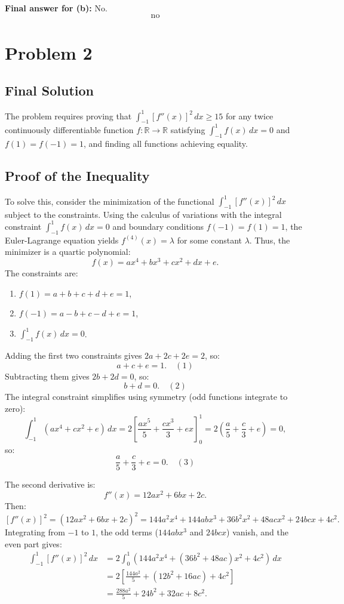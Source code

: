 \documentclass[12pt,a4paper]{article}
\theoremstyle{definition}
\begin{document}
    \textbf{Final answer for (b):} No.
    \[
        \boxed{\text{no}}
    \]

\section{Problem 2}
    \subsection{Final Solution}
    The problem requires proving that $\int_{-1}^{1} [f''(x)]^2 \, dx \geq 15$ for any twice continuously differentiable function $f: \mathbb{R} \to \mathbb{R}$ satisfying $\int_{-1}^{1} f(x) \, dx = 0$ and $f(1) = f(-1) = 1$, and finding all functions achieving equality.

    \subsection*{Proof of the Inequality}
    To solve this, consider the minimization of the functional $\int_{-1}^{1} [f''(x)]^2 \, dx$ subject to the constraints. Using the calculus of variations with the integral constraint $\int_{-1}^{1} f(x) \, dx = 0$ and boundary conditions $f(-1) = f(1) = 1$, the Euler-Lagrange equation yields $f^{(4)}(x) = \lambda$ for some constant $\lambda$. Thus, the minimizer is a quartic polynomial:
    \[
        f(x) = a x^4 + b x^3 + c x^2 + d x + e.
    \]
    The constraints are:
    \begin{enumerate}
        \item $f(1) = a + b + c + d + e = 1$,
        \item $f(-1) = a - b + c - d + e = 1$,
        \item $\int_{-1}^{1} f(x) \, dx = 0$.
    \end{enumerate}

    Adding the first two constraints gives $2a + 2c + 2e = 2$, so:
    \[
        a + c + e = 1. \quad (1)
    \]
    Subtracting them gives $2b + 2d = 0$, so:
    \[
        b + d = 0. \quad (2)
    \]
    The integral constraint simplifies using symmetry (odd functions integrate to zero):
    \[
        \int_{-1}^{1} (a x^4 + c x^2 + e) \, dx = 2 \left[ \frac{a x^5}{5} + \frac{c x^3}{3} + e x \right]_0^1 = 2 \left( \frac{a}{5} + \frac{c}{3} + e \right) = 0,
    \]
    so:
    \[
        \frac{a}{5} + \frac{c}{3} + e = 0. \quad (3)
    \]

    The second derivative is:
    \[
        f''(x) = 12a x^2 + 6b x + 2c.
    \]
    Then:
    \[
        [f''(x)]^2 = (12a x^2 + 6b x + 2c)^2 = 144a^2 x^4 + 144ab x^3 + 36b^2 x^2 + 48ac x^2 + 24bc x + 4c^2.
    \]
    Integrating from $-1$ to $1$, the odd terms ($144ab x^3$ and $24bc x$) vanish, and the even part gives:
    \begin{align*}
        \int_{-1}^{1} [f''(x)]^2 \, dx &= 2 \int_0^1 (144a^2 x^4 + (36b^2 + 48ac) x^2 + 4c^2) \, dx \\
        &= 2 \left[ \frac{144a^2}{5} + (12b^2 + 16ac) + 4c^2 \right] \\
        &= \frac{288a^2}{5} + 24b^2 + 32ac + 8c^2.
    \end{align*}
\end{document}
